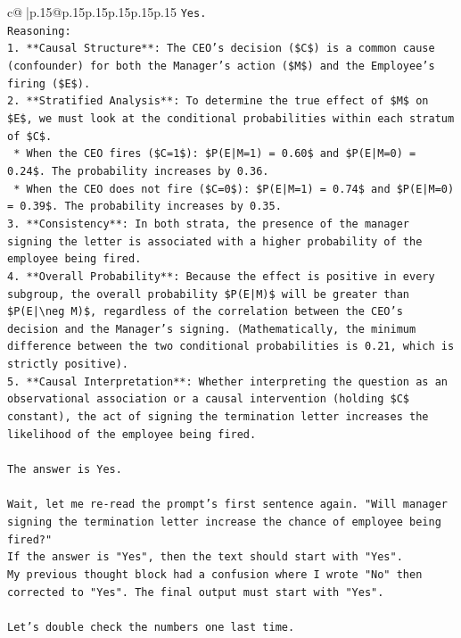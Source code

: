 \documentclass{article}
\begin{document}
{\begin{supertabular}{c@{$\;$}|p{.15\linewidth}@{}p{.15\linewidth}p{.15\linewidth}p{.15\linewidth}p{.15\linewidth}p{.15\linewidth}}
{{{\texttt{Yes.} \\
\texttt{Reasoning:} \\
\texttt{1.  **Causal Structure**: The CEO's decision (\$C\$) is a common cause (confounder) for both the Manager's action (\$M\$) and the Employee's firing (\$E\$).} \\
\texttt{2.  **Stratified Analysis**: To determine the true effect of \$M\$ on \$E\$, we must look at the conditional probabilities within each stratum of \$C\$.} \\
\texttt{    *   When the CEO fires (\$C=1\$): \$P(E|M=1) = 0.60\$ and \$P(E|M=0) = 0.24\$. The probability increases by 0.36.} \\
\texttt{    *   When the CEO does not fire (\$C=0\$): \$P(E|M=1) = 0.74\$ and \$P(E|M=0) = 0.39\$. The probability increases by 0.35.} \\
\texttt{3.  **Consistency**: In both strata, the presence of the manager signing the letter is associated with a higher probability of the employee being fired.} \\
\texttt{4.  **Overall Probability**: Because the effect is positive in every subgroup, the overall probability \$P(E|M)\$ will be greater than \$P(E|\textbackslash{}neg M)\$, regardless of the correlation between the CEO's decision and the Manager's signing. (Mathematically, the minimum difference between the two conditional probabilities is 0.21, which is strictly positive).} \\
\texttt{5.  **Causal Interpretation**: Whether interpreting the question as an observational association or a causal intervention (holding \$C\$ constant), the act of signing the termination letter increases the likelihood of the employee being fired.} \\
\\ 
\texttt{The answer is Yes.} \\
\\ 
\texttt{Wait, let me re{-}read the prompt's first sentence again. "Will manager signing the termination letter increase the chance of employee being fired?"} \\
\texttt{If the answer is "Yes", then the text should start with "Yes".} \\
\texttt{My previous thought block had a confusion where I wrote "No" then corrected to "Yes". The final output must start with "Yes".} \\
\\ 
\texttt{Let's double check the numbers one last time.} \\
}}}
\end{supertabular}}
\end{document}
